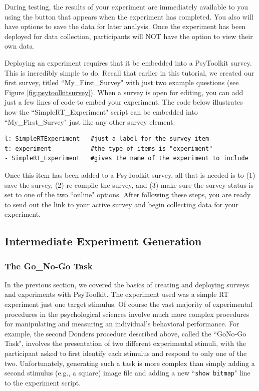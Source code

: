 During testing, the results of your experiment are immediately available to you using the  button that appears when the experiment has completed.  You also will have options to save the data for later analysis.  Once the experiment has been deployed for data collection, participants will NOT have the option to view their own data.

Deploying an experiment requires that it be embedded into a PsyToolkit survey. This is incredibly simple to do.  Recall that earlier in this tutorial, we created our first survey, titled ``My\_First\_Survey" with just two example questions (see Figure \ref{fig:psytoolkitsurvey}).  When a survey is open for editing, you can add just a few lines of code to embed your experiment. The code below illustrates how the ``SimpleRT\_Experiment" script can be embedded into ``My\_First\_Survey" just like any other survey element:
\begin{Verbatim}[xleftmargin=.5in]
l: SimpleRTExperiment   #just a label for the survey item
t: experiment           #the type of items is "experiment"
- SimpleRT_Experiment   #gives the name of the experiment to include
\end{Verbatim}

Once this item has been added to a PsyToolkit survey, all that is needed is to (1) save the survey, (2) re-compile the survey, and (3) make sure the survey status is set to one of the two ``online" options. After following these steps, you are ready to send out the link to your active survey and begin collecting data for your experiment.  

\subsection{Intermediate Experiment Generation}
\subsubsection{The Go\_No-Go Task}
In the previous section, we covered the basics of creating and deploying surveys and experiments with PsyToolkit.  The experiment used was a simple RT experiment just one target stimulus.  Of course the vast majority of experimental procedures in the psychological sciences involve much more complex procedures for manipulating and measuring an individual's behavioral performance.  For example, the second Donders procedure described above, called the ``GoNo-Go Task", involves the presentation of two different experimental stimuli, with the participant asked to first identify each stimulus and respond to only one of the two.  Unfortunately, generating such a task is more complex than simply adding a second stimulus (e.g., a square) image file and adding a new ``\texttt{show bitmap}" line to the experiment script.

